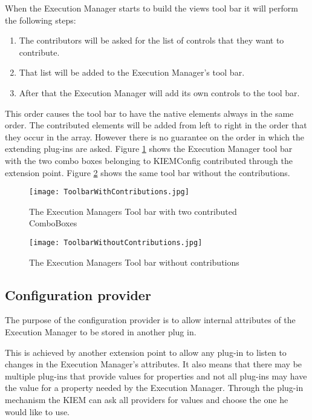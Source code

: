 When the Execution Manager starts to build the views tool bar it will perform the following steps:
\begin{enumerate}
 \item The contributors will be asked for the list of controls that they want to contribute.
 \item That list will be added to the Execution Manager's tool bar.
 \item After that the Execution Manager will add its own controls to the tool bar.
\end{enumerate}
This order causes the tool bar to have the native elements always in the same order.
The contributed elements will be added from left to right in the order that they occur in the array. However there
is no guarantee on the order in which the extending plug-ins are asked.
Figure \ref{fig:ToolbarWithContributions} shows the Execution Manager tool bar with the two combo boxes belonging to \ac{KIEMConfig}
contributed through the extension point. Figure \ref{fig:ToolbarWithoutContributions} shows the same tool bar without
the contributions.
\begin{figure}[Toolbar With Contributions]
  \centering
  \texttt{[image: ToolbarWithContributions.jpg]}
  \caption[The Execution Managers Tool bar with two contributed ComboBoxes]%
  {The Execution Managers Tool bar with two contributed ComboBoxes\protect}
  \label{fig:ToolbarWithContributions}
\end{figure}
\begin{figure}[Toolbar Without Contributions]
  \centering
  \texttt{[image: ToolbarWithoutContributions.jpg]}
  \caption[The Execution Managers Tool bar without contributions]%
  {The Execution Managers Tool bar without contributions\protect}
  \label{fig:ToolbarWithoutContributions}
\end{figure}

\subsection{Configuration provider}
\label{section:ConfigurationProvider}
The purpose of the configuration provider is to allow internal attributes of the
Execution Manager to be stored in another plug in. 

This is achieved by another extension point to allow any plug-in to listen to changes
in the Execution Manager's attributes. It also means that there may be multiple
plug-ins that provide values for properties and not all plug-ins may have the value for
a property needed by the Execution Manager. Through the plug-in mechanism the \ac{KIEM}
can ask all providers for values and choose the one he would like to use.

